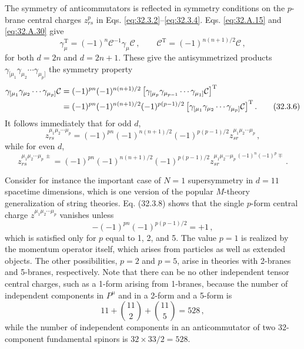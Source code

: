 The symmetry of anticommutators is reflected in symmetry conditions on
the \(p\)-brane central charges \(z_{rs}^p\) in
Eqs. \eqref{eq:32.3.2}--\eqref{eq:32.3.4}. Eqs. \eqref{eq:32.A.15} and
\eqref{eq:32.A.30} give
\begin{equation}
  \gamma_\mu^{\mathrm T}
  =(-1)^n\mathcal C^{-1}\gamma_\mu\mathcal C\,,
  \qquad
  \mathcal C^{\mathrm T}
  =(-1)^{n(n+1)/2}\mathcal C\,,
  \tag{32.3.5}\label{eq:32.3.5}
\end{equation}
for both \(d=2n\) and \(d=2n+1\). These give the antisymmetrized products
\(\gamma_{[\mu_1}\gamma_{\mu_2}\cdots\gamma_{\mu_p]}\) the symmetry
property
\begin{align}
  \gamma_{[\mu_1}\gamma_{\mu_2}\cdots\gamma_{\mu_p]}\mathcal C
  &=
  (-1)^{pn}(-1)^{n(n+1)/2}
  \left[
    \gamma_{[\mu_p}\gamma_{\mu_{p-1}}\cdots\gamma_{\mu_1]}\mathcal C
  \right]^{\mathrm T}
  \notag\\
  &=
  (-1)^{pn}(-1)^{n(n+1)/2}(-1)^{p(p-1)/2}
  \left[
    \gamma_{[\mu_1}\gamma_{\mu_2}\cdots\gamma_{\mu_p]}\mathcal C
  \right]^{\mathrm T}.
  \tag{32.3.6}\label{eq:32.3.6}
\end{align}
It follows immediately that for odd \(d\),
\begin{equation}
  z_{rs}^{\mu_1\mu_2\cdots\mu_p}
  =(-1)^{pn}(-1)^{n(n+1)/2}(-1)^{p(p-1)/2}
   z_{sr}^{\mu_1\mu_2\cdots\mu_p}\,,
  \tag{32.3.7}\label{eq:32.3.7}
\end{equation}
while for even \(d\),
\begin{equation}
  z_{rs}^{\mu_1\mu_2\cdots\mu_p\,\pm}
  =(-1)^{pn}(-1)^{n(n+1)/2}(-1)^{p(p-1)/2}
   z_{sr}^{\mu_1\mu_2\cdots\mu_p\,(-1)^n(-1)^p\mp}\,.
  \tag{32.3.8}\label{eq:32.3.8}
\end{equation}

Consider for instance the important case of \(N=1\) supersymmetry in
\(d=11\) spacetime dimensions, which is one version of the popular
\(M\)-theory generalization of string theories. Eq. (32.3.8) shows that
the single \(p\)-form central charge \(z^{\mu_1\mu_2\cdots\mu_p}\)
vanishes unless
\begin{equation}
  -(-1)^{pn}(-1)^{p(p-1)/2}=+1\,,
  \tag{32.3.9}\label{eq:32.3.9}
\end{equation}
which is satisfied only for \(p\) equal to 1, 2, and 5. The value \(p=1\)
is realized by the momentum operator itself, which arises from particles
as well as extended objects. The other possibilities, \(p=2\) and
\(p=5\), arise in theories with 2-branes and 5-branes, respectively. Note
that there can be no other independent tensor central charges, such as a
1-form arising from 1-branes, because the number of independent components
in \(P^\mu\) and in a 2-form and a 5-form is
\[
  11+\binom{11}{2}+\binom{11}{5}=528\,,
\]
while the number of independent components in an anticommutator of two
32-component fundamental spinors is \(32\times33/2=528\).

